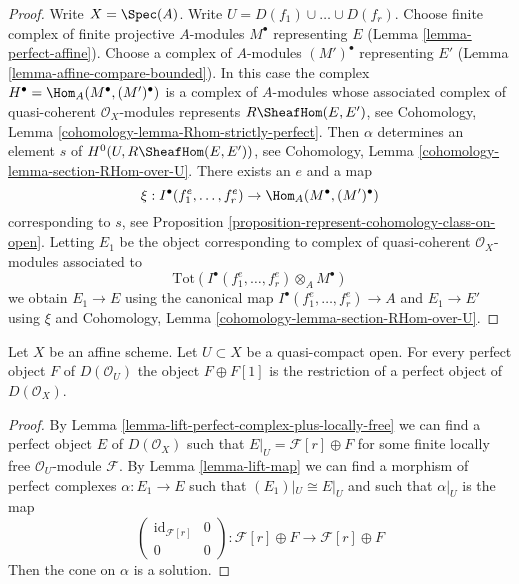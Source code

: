 \begin{proof}
Write $X = \Spec(A)$. Write $U = D(f_1) \cup \ldots \cup D(f_r)$. Choose
finite complex of finite projective $A$-modules $M^\bullet$ representing
$E$ (Lemma \ref{lemma-perfect-affine}). Choose a complex of $A$-modules
$(M')^\bullet$ representing $E'$ (Lemma \ref{lemma-affine-compare-bounded}).
In this case the complex $H^\bullet = \Hom_A(M^\bullet, (M')^\bullet)$
is a complex of $A$-modules whose associated complex of quasi-coherent
$\mathcal{O}_X$-modules represents $R\SheafHom(E, E')$, see
Cohomology, Lemma \ref{cohomology-lemma-Rhom-strictly-perfect}.
Then $\alpha$ determines an element $s$ of $H^0(U, R\SheafHom(E, E'))$, see
Cohomology, Lemma \ref{cohomology-lemma-section-RHom-over-U}.
There exists an $e$ and a map
$$
\xi : I^\bullet(f_1^e, \ldots, f_r^e) \to \Hom_A(M^\bullet, (M')^\bullet)
$$
corresponding to $s$, see
Proposition \ref{proposition-represent-cohomology-class-on-open}.
Letting $E_1$ be the object corresponding to
complex of quasi-coherent $\mathcal{O}_X$-modules
associated to
$$
\text{Tot}(I^\bullet(f_1^e, \ldots, f_r^e) \otimes_A M^\bullet)
$$
we obtain $E_1 \to E$ using the canonical map
$I^\bullet(f_1^e, \ldots, f_r^e) \to A$ and $E_1 \to E'$
using $\xi$ and
Cohomology, Lemma \ref{cohomology-lemma-section-RHom-over-U}.
\end{proof}

\begin{lemma}
\label{lemma-lift-perfect-complex-plus-shift}
Let $X$ be an affine scheme. Let $U \subset X$ be a quasi-compact open.
For every perfect object $F$ of $D(\mathcal{O}_U)$
the object $F \oplus F[1]$ is the restriction of
a perfect object of $D(\mathcal{O}_X)$.
\end{lemma}

\begin{proof}
By Lemma \ref{lemma-lift-perfect-complex-plus-locally-free}
we can find a perfect object $E$ of $D(\mathcal{O}_X)$
such that $E|_U = \mathcal{F}[r] \oplus F$ for some finite locally
free $\mathcal{O}_U$-module $\mathcal{F}$.
By Lemma \ref{lemma-lift-map} we can find a morphism of
perfect complexes $\alpha : E_1 \to E$ such that $(E_1)|_U \cong E|_U$
and such that $\alpha|_U$ is the map
$$
\left(
\begin{matrix}
\text{id}_{\mathcal{F}[r]} & 0 \\
0 & 0
\end{matrix}
\right)
:
\mathcal{F}[r] \oplus F \to \mathcal{F}[r] \oplus F
$$
Then the cone on $\alpha$ is a solution.
\end{proof}

